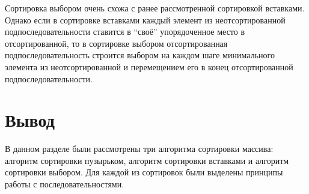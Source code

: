 Сортировка выбором очень схожа с ранее рассмотренной сортировкой вставками. Однако если в сортировке вставками каждый элемент из неотсортированной подпоследовательности ставится в ``своё'' упорядоченное место в отсортированной, то в сортировке выбором отсортированная подпоследовательность строится выбором на каждом шаге минимального элемента из неотсортированной и перемещением его в конец отсортированной подпоследовательности.


\section{Вывод}

В данном разделе были рассмотрены три алгоритма сортировки массива: алгоритм сортировки пузырьком, алгоритм сортировки вставками и алгоритм сортировки выбором. Для каждой из сортировок были выделены принципы работы с последовательностями.


